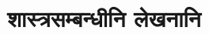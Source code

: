 \documentclass[11pt,twoside,openany]{book}
\begin{document}
\def\@part[#1]#2{%
    \ifnum \c@secnumdepth >-2\relax
      \refstepcounter{part}%
      \addcontentsline{toc}{part}{\thepart\hspace{1em}#1}%
    \else
      \addcontentsline{toc}{part}{#1}%
    \fi
    \markboth{}{}%
    {\centering
     \interlinepenalty \@M
     \normalfont
     \ifnum \c@secnumdepth >-2\relax
       {\selectlanguage{english}\englishfont\huge\bfseries \partname\nobreakspace\thepart}
       \par
       \vskip 20\p@
     \fi
     \devanagarifont\Huge\bfseries #2\par}%
    \@endpart}

\makeatother

\part{शास्त्रसम्बन्धीनि लेखनानि}


\end{document}
